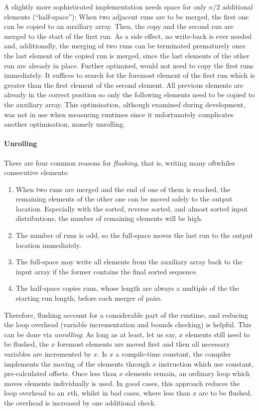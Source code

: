 A slightly more sophisticated implementation needs space for only \(n/2\) additional elements (\enquote{half-space}):
When two adjacent runs are to be merged, the first one can be copied to an auxiliary array.
Then, the copy and the second run are merged to the start of the first run.
As a side effect, no write-back is ever needed and, additionally, the merging of two runs can be terminated prematurely once the last element of the copied run is merged, since the last elements of the other run are already in place.
Further optimised, \MS{} would not need to copy the first runs immediately.
It suffices to search for the foremost element of the first run which is greater than the first element of the second element.
All previous elements are already in the correct position so only the following elements need to be copied to the auxiliary array.
This optimisation, although examined during development, was not in use when measuring runtimes since it unfortunately complicates another optimisation, namely unrolling.


\paragraph{Unrolling}
There are four common reasons for \emph{flushing}, that is, writing \Dash many oftwhiles \Dash consecutive elements:
\begin{enumerate}
	\item
	When two runs are merged and the end of one of them is reached, the remaining elements of the other one can be moved safely to the output location.
	Especially with the sorted, reverse sorted, and almost sorted input distributions, the number of remaining elements will be high.

	\item
	The number of runs is odd, so the full-space \MS{} moves the last run to the output location immediately.

	\item
	The full-space \MS{} may write all elements from the auxiliary array back to the input array if the former contains the final sorted sequence.

	\item
	The half-space \MS{} copies runs, whose length are always a multiple of the the starting run length, before each merger of pairs.
\end{enumerate}
Therefore, flushing account for a considerable part of the runtime, and reducing the loop overhead (variable incrementation and bounds checking) is helpful.
This can be done via \emph{unrolling}:
As long as at least, let us say, \(x\) elements still need to be flushed, the \(x\) foremost elements are moved first and then all necessary variables are incremented by \(x\).
Is \(x\) a compile-time constant, the compiler implements the moving of the elements through \(x\) instruction which use constant, pre-calculated offsets.
Once less than \(x\) elements remain, an ordinary loop which moves elements individually is used.
In good cases, this approach reduces the loop overhead to an \(x\)th, whilst in bad cases, where less than \(x\) are to be flushed, the overhead is increased by one additional check.

